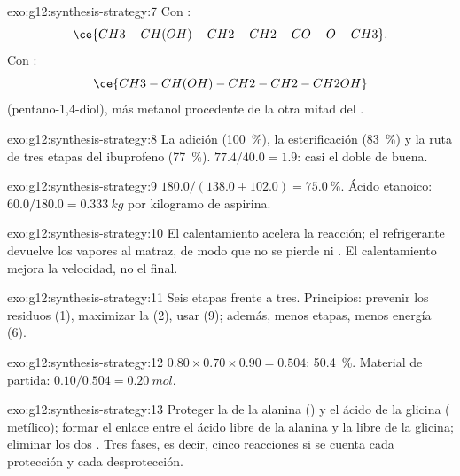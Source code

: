 \begin{solution}{exo:g12:synthesis-strategy:7}
Con :
\[ \ce{CH3-CH(OH)-CH2-CH2-CO-O-CH3} . \]
Con :
\[ \ce{CH3-CH(OH)-CH2-CH2-CH2OH} \]
(pentano-1,4-diol), más metanol procedente de la otra mitad del .
\end{solution}

\begin{solution}{exo:g12:synthesis-strategy:8}
La adición (\qty{100}{\percent}), la esterificación
(\qty{83}{\percent}) y la ruta de tres etapas del ibuprofeno
(\qty{77}{\percent}). $77.4/40.0 = 1.9$: casi el doble de buena.
\end{solution}

\begin{solution}{exo:g12:synthesis-strategy:9}
$180.0/(138.0 + 102.0) = \qty{75.0}{\percent}$. Ácido etanoico:
$60.0/180.0 = \qty{0.333}{kg}$ por kilogramo de aspirina.
\end{solution}

\begin{solution}{exo:g12:synthesis-strategy:10}
El calentamiento acelera la reacción; el refrigerante devuelve los
vapores al matraz, de modo que no se pierde  ni . El
calentamiento mejora la velocidad, no el  final.
\end{solution}

\begin{solution}{exo:g12:synthesis-strategy:11}
Seis etapas frente a tres. Principios: prevenir los residuos (1),
maximizar la  (2), usar  (9); además, menos
etapas, menos energía (6).
\end{solution}

\begin{solution}{exo:g12:synthesis-strategy:12}
$0.80 \times 0.70 \times 0.90 = 0.504$: \qty{50.4}{\percent}. Material de
partida: $0.10/0.504 = \qty{0.20}{mol}$.
\end{solution}

\begin{solution}{exo:g12:synthesis-strategy:13}
Proteger la  de la alanina () y el ácido de la glicina (
metílico); formar el enlace  entre el ácido libre de la alanina y la
 libre de la glicina; eliminar los dos . Tres
fases, es decir, cinco reacciones si se cuenta cada protección y cada
desprotección.
\end{solution}

